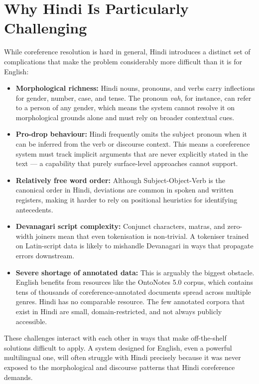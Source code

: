 \documentclass[12pt,a4paper]{report}
\begin{document}
\section{Why Hindi Is Particularly Challenging}

While coreference resolution is hard in general, Hindi introduces a distinct set of complications that make the problem considerably more difficult than it is for English:

\begin{itemize}
    \item \textbf{Morphological richness:} Hindi nouns, pronouns, and verbs carry inflections for gender, number, case, and tense. The pronoun \textit{vah}, for instance, can refer to a person of any gender, which means the system cannot resolve it on morphological grounds alone and must rely on broader contextual cues.

    \item \textbf{Pro-drop behaviour:} Hindi frequently omits the subject pronoun when it can be inferred from the verb or discourse context. This means a coreference system must track implicit arguments that are never explicitly stated in the text --- a capability that purely surface-level approaches cannot support.

    \item \textbf{Relatively free word order:} Although Subject-Object-Verb is the canonical order in Hindi, deviations are common in spoken and written registers, making it harder to rely on positional heuristics for identifying antecedents.

    \item \textbf{Devanagari script complexity:} Conjunct characters, matras, and zero-width joiners mean that even tokenisation is non-trivial. A tokeniser trained on Latin-script data is likely to mishandle Devanagari in ways that propagate errors downstream.

    \item \textbf{Severe shortage of annotated data:} This is arguably the biggest obstacle. English benefits from resources like the OntoNotes 5.0 corpus, which contains tens of thousands of coreference-annotated documents spread across multiple genres. Hindi has no comparable resource. The few annotated corpora that exist in Hindi are small, domain-restricted, and not always publicly accessible.
\end{itemize}

These challenges interact with each other in ways that make off-the-shelf solutions difficult to apply. A system designed for English, even a powerful multilingual one, will often struggle with Hindi precisely because it was never exposed to the morphological and discourse patterns that Hindi coreference demands.
\end{document}
